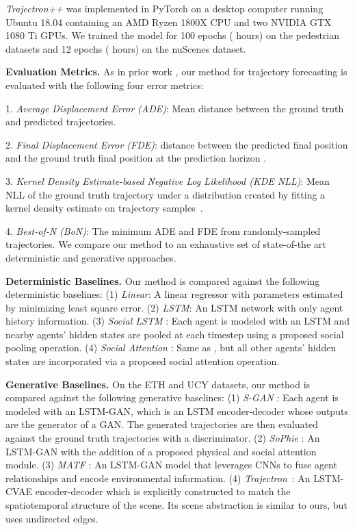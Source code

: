 \documentclass[runningheads]{llncs}
\newcommand{\algname}{\mbox{Trajectron++}}
\newcommand{\emphalgname}{\emph{\algname}}
\begin{document}
\emphalgname{} was implemented in PyTorch \cite{PaszkeGrossEtAl2017}
on a desktop computer running Ubuntu 18.04 containing an AMD Ryzen 1800X CPU and two NVIDIA GTX 1080 Ti GPUs.
We trained the model for 100 epochs ( hours) on the pedestrian datasets and 12 epochs ( hours) on the nuScenes dataset.

{\bf Evaluation Metrics.} As in prior work \cite{AlahiGoelEtAl2016,GuptaJohnsonEtAl2018,IvanovicPavone2019,SadeghianKosarajuEtAl2019,KosarajuSadeghianEtAl2019,ZhaoXuEtAl2019}, our method for trajectory forecasting is evaluated with the following four error metrics:


    1. \textit{Average Displacement Error (ADE)}: Mean  distance between the ground truth and predicted trajectories.
    
    2. \textit{Final Displacement Error (FDE)}:  distance between the predicted final position and the ground truth final position at the prediction horizon .
    
    3. \textit{Kernel Density Estimate-based Negative Log Likelihood (KDE NLL)}: Mean NLL of the ground truth trajectory under a distribution created by fitting a kernel density estimate on trajectory samples~\cite{IvanovicPavone2019,ThiedeBrahma2019}.
    
    4. \textit{Best-of-N (BoN)}: The minimum ADE and FDE from  randomly-sampled trajectories.
We compare our method to an exhaustive set of state-of-the art deterministic and generative approaches.


{\bf Deterministic Baselines.} Our method is compared against the following deterministic baselines: (1) \textit{Linear}: A linear regressor with parameters estimated by minimizing least square error. (2) \textit{LSTM}: An LSTM network with only agent history information. (3) \textit{Social LSTM} \cite{AlahiGoelEtAl2016}: Each agent is modeled with an LSTM and nearby agents' hidden states are pooled at each timestep using a proposed social pooling operation. (4) \textit{Social Attention} \cite{VemulaMuellingEtAl2018}: Same as \cite{AlahiGoelEtAl2016}, but all other agents' hidden states are incorporated via a proposed social attention operation.

{\bf Generative Baselines.} On the ETH and UCY datasets, our method is compared against the following generative baselines: 
(1) \textit{S-GAN} \cite{GuptaJohnsonEtAl2018}: Each agent is modeled with an LSTM-GAN, which is an LSTM encoder-decoder whose outputs are the generator of a GAN. The generated trajectories are then evaluated against the ground truth trajectories with a discriminator. 
(2) \textit{SoPhie} \cite{SadeghianKosarajuEtAl2019}: An LSTM-GAN with the addition of a proposed physical and social attention module. 
(3) \textit{MATF} \cite{ZhaoXuEtAl2019}: An LSTM-GAN model that leverages CNNs to fuse agent relationships and encode environmental information. 
(4) \textit{Trajectron}~\cite{IvanovicPavone2019}: An LSTM-CVAE encoder-decoder which is explicitly constructed to match the spatiotemporal structure of the scene. Its scene abstraction is similar to ours, but uses undirected edges.
\end{document}
